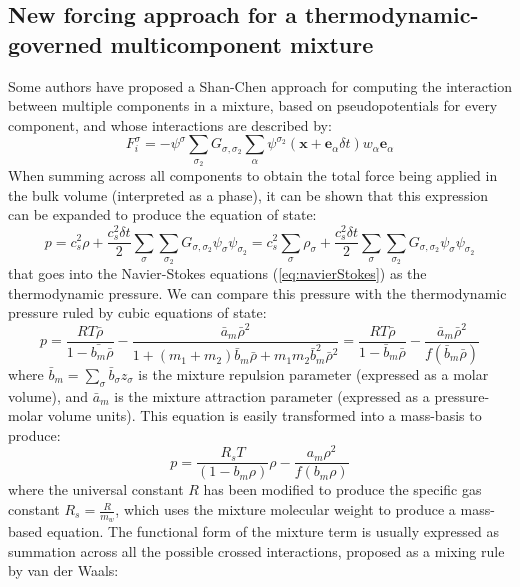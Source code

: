 \documentclass{article}
\newcommand{\locx}{\mathbf{x}}
\newcommand{\vele}{\mathbf{e}_\alpha}
\begin{document}
	\subsection{New forcing approach for a thermodynamic-governed multicomponent mixture}
	Some authors have proposed a Shan-Chen approach for computing the interaction between multiple components in a mixture, based on pseudopotentials for every component, and whose interactions are described by:
	\begin{equation}
		F_i^\sigma = - \psi^\sigma \sum_{\sigma_2} G_{\sigma,\sigma_2} \sum_\alpha \psi^{\sigma_2} ( \locx + \vele \delta t)  w_\alpha \vele
	\end{equation}
	When summing across all components to obtain the total force being applied in the bulk volume (interpreted as a phase), it can be shown that this expression can be expanded to produce the equation of state:
	\begin{equation}\label{eq:pressureLBMPseudoP}
		p = c_s^2 \rho + \frac{c_s^2 \delta t}{2} \sum_\sigma \sum_{\sigma_2} G_{\sigma,\sigma_2} \psi_\sigma \psi_{\sigma_2} = c_s^2 \sum_\sigma \rho_\sigma + \frac{c_s^2 \delta t}{2} \sum_\sigma \sum_{\sigma_2} G_{\sigma,\sigma_2} \psi_\sigma \psi_{\sigma_2}
	\end{equation}
	that goes into the Navier-Stokes equations (\ref{eq:navierStokes}) as the thermodynamic pressure. We can compare this pressure with the thermodynamic pressure ruled by cubic equations of state:
	\begin{equation}
		p = \frac{RT\bar{\rho}}{1-\bar{b_m} \bar{\rho}} - \frac{\bar{a}_m \bar{\rho}^2}{1 + (m_1 + m_2) \bar{b}_m \bar{\rho} + m_1 m_2 \bar{b}^2_m \bar{\rho}^2} =  \frac{RT\bar{\rho}}{1-\bar{b}_m \bar{\rho}} - \frac{\bar{a}_m \bar{\rho}^2}{f(\bar{b}_m \bar{\rho})}
	\end{equation}
	where $\bar{b}_m = \sum_\sigma \bar{b}_\sigma z_\sigma$ is the mixture repulsion parameter (expressed as a molar volume), and $\bar{a}_m$ is the mixture attraction parameter (expressed as a pressure-molar volume units). This equation is easily transformed into a mass-basis to produce:
	\begin{equation}
		p = \frac{R_sT}{(1-b_m \rho)} \rho - \frac{a_m \rho^2}{f(b_m \rho)}
	\end{equation}
	where the universal constant $R$ has been modified to produce the specific gas constant $R_s = \frac{R}{m_w}$, which uses the mixture molecular weight to produce a mass-based equation. The functional form of the mixture term is usually expressed as summation across all the possible crossed interactions, proposed as a mixing rule by van der Waals:
\end{document}
